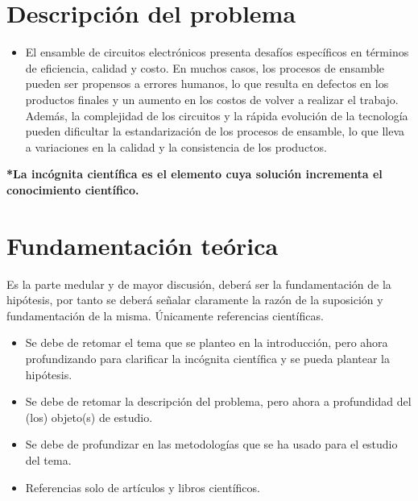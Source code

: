    \begin{itemize}
    \end{itemize}
    \section{Descripción del problema}
    \begin{itemize}
        \item El ensamble de circuitos electrónicos presenta desafíos específicos en términos de eficiencia, calidad y costo. En muchos casos, los procesos de ensamble pueden ser propensos a errores humanos, lo que resulta en defectos en los productos finales y un aumento en los costos de volver a realizar el trabajo. Además, la complejidad de los circuitos y la rápida evolución de la tecnología pueden dificultar la estandarización de los procesos de ensamble, lo que lleva a variaciones en la calidad y la consistencia de los productos.
    
    \end{itemize}
    
    \textbf{*La incógnita científica es el elemento cuya solución incrementa el conocimiento
    científico.}
    \section{Fundamentación teórica}
    
    Es la parte medular y de mayor discusión, deberá ser la fundamentación de la hipótesis, por tanto se deberá señalar claramente la razón de la suposición y fundamentación de la misma. Únicamente referencias científicas.
    \begin{itemize}
        \item Se debe de retomar el tema que se planteo en la introducción, pero ahora profundizando para clarificar la incógnita científica y se pueda plantear la hipótesis.
        \item Se debe de retomar la descripción del problema, pero ahora a profundidad del (los) objeto(s) de estudio. 
        \item Se debe de profundizar en las metodologías que se ha usado para el estudio del tema.
        \item Referencias solo de artículos y libros científicos.
    \end{itemize}
